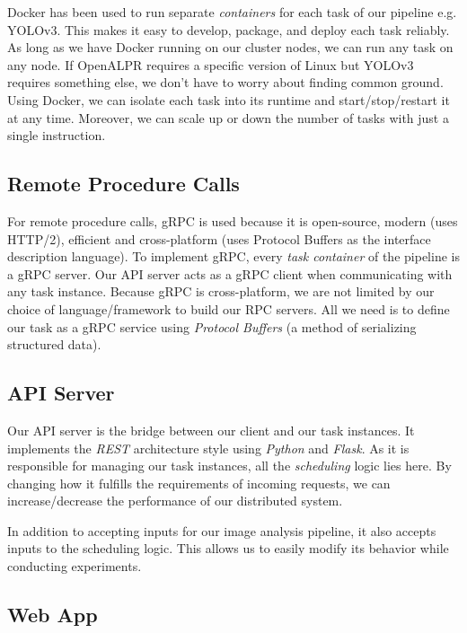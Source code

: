 \documentclass{report}
\begin{document}
Docker \cite{Docker} has been used to run separate \textit{containers} for each task of our pipeline e.g. YOLOv3.
This makes it easy to develop, package, and deploy each task reliably.
As long as we have Docker running on our cluster nodes, we can run any task on any node.
If OpenALPR requires a specific version of Linux but YOLOv3 requires something else, we don't have to worry about finding common ground.
Using Docker, we can isolate each task into its runtime and start/stop/restart it at any time.
Moreover, we can scale up or down the number of tasks with just a single instruction.

\subsection{Remote Procedure Calls}

For remote procedure calls, gRPC \cite{gRPC} is used because it is open-source, modern (uses HTTP/2), efficient and cross-platform (uses Protocol Buffers as the interface description language).
To implement gRPC, every \textit{task container} of the pipeline is a gRPC server.
Our API server acts as a gRPC client when communicating with any task instance.
Because gRPC is cross-platform, we are not limited by our choice of language/framework to build our RPC servers.
All we need is to define our task as a gRPC service using \textit{Protocol Buffers} \cite{ProtocolBuffers} (a method of serializing structured data).

\subsection{API Server}

Our API server is the bridge between our client and our task instances.
It implements the \textit{REST} architecture style using \textit{Python} and \textit{Flask}.
As it is responsible for managing our task instances, all the \textit{scheduling} logic lies here.
By changing how it fulfills the requirements of incoming requests, we can increase/decrease the performance of our distributed system.

In addition to accepting inputs for our image analysis pipeline, it also accepts inputs to the scheduling logic.
This allows us to easily modify its behavior while conducting experiments.

\subsection{Web App}
\end{document}

